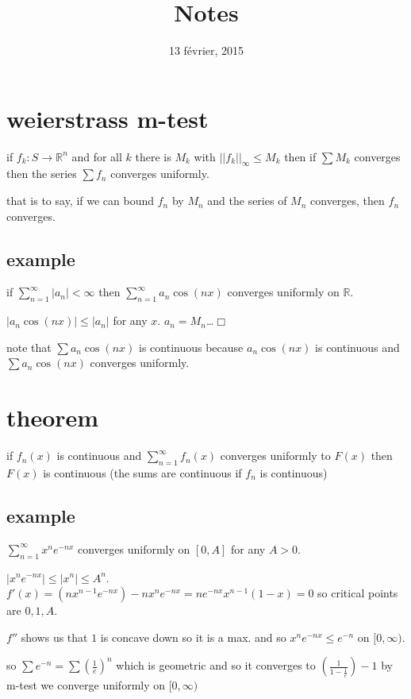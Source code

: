 \documentclass[letterpaper]{article}
\begin{document}
\title{Notes}
\date{13 février, 2015}
\maketitle
\section*{weierstrass m-test}
if $f_{k}:S\to \mathbb{R}^n$ and for all $k$ there is $M_k$ with $||f_k||_\infty\le M_k$ then if $\sum\limits{M_k}$ converges then the series $\sum\limits{f_n}$ converges uniformly.

that is to say, if we can bound $f_n$ by  $M_n$ and the series of $M_n$ converges, then $f_n$ converges.
\subsection*{example}
if $\sum\limits_{n=1}^\infty{|a_n|}<\infty$ then $\sum\limits_{n=1}^\infty{a_n\cos(nx)}$ converges uniformly on $\mathbb{R}$.

$|a_n\cos(nx)|\le |a_n|$ for any  $x$. $a_n=M_n$\dots$\Box$

note that $\sum a_n\cos(nx)$ is continuous because $a_n\cos(nx)$ is continuous and $\sum a_n\cos(nx)$ converges uniformly.

\section*{theorem}
if $f_n(x)$ is continuous and $\sum\limits_{n=1}^\infty{f_n(x)}$ converges uniformly to $F(x)$ then $F(x)$ is continuous (the sums are continuous if $f_n$ is continuous)

\subsection*{example}
$\sum\limits_{n=1}^\infty{x^ne^{-nx}}$ converges uniformly  on $[0,A]$ for any $A>0$.

$|x^ne^{-nx}|\le |x^n|\le A^n$. $f'(x)=(nx^{n-1}e^{-nx})-nx^ne^{-nx}=ne^{-nx}x^{n-1}(1-x)=0$ so critical points are $0,1,A$.

$f''$ shows us that $1$ is concave down so it is a max. and so $x^ne^{-nx}\le e^{-n}$ on $[0,\infty)$.

so $\sum\limits{e^{-n}}=\sum\limits{\left(\frac{1}{e}\right)^n}$ which is geometric and so it converges to $\left(\frac{1}{1-\frac{1}{e}}\right)-1$ by m-test we converge uniformly on $[0,\infty)$
\end{document}
